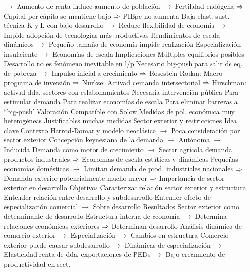 \documentclass{nuevotema}
\begin{document}
\begin{esquemal}
				\4[] $\to$ Aumento de renta induce aumento de población
				\4[] $\to$ Fertilidad endógena
				\4[] $\Rightarrow$ Capital per cápita se mantiene bajo
				\4[] $\Rightarrow$ PIBpc no aumenta
				\4 Baja elast. sust. técnica K y L con bajo desarrollo
				\4[] $\to$ Reduce flexibilidad de economía
				\4[] $\to$ Impide adopción de tecnologías más productivas
				\4 Rendimientos de escala dinámicos
				\4[] $\to$ Pequeño tamaño de economía impide realización
				\4 Especialización insuficiente
				\4[] $\to$ Economías de escala
			\3 Implicaciones
				\4 Múltiples equilibrios posibles
				\4[] Desarrollo no es fenómeno inevitable en l/p
				\4 Necesario big-push para salir de eq. de pobreza
				\4[] $\to$ Impulso inicial a crecimiento
				\4[] $\Rightarrow$ Rosestein-Rodan: Macro-programa de inversión
				\4[] $\Rightarrow$ Nurkse: Activad demanda intersectorial
				\4[] $\Rightarrow$ Hirschman: activad dda. sectores con eslabonamientos
				\4 Necesaria intervención pública
				\4[] Para estimular demanda
				\4[] Para realizar economías de escala
				\4[] Para eliminar barreras a ``big-push'
			\3 Valoración
				\4 Compatible con Solow
				\4 Medidas de pol. económica muy heterogéneas
				\4[] Justificables muchas medidas
		\2 Sector exterior y restricciones
			\3 Idea clave
				\4 Contexto
				\4[] Harrod-Domar y modelo neoclásico
				\4[] $\to$ Poca consideración por sector exterior
				\4[] Concepción keynesiana de la demanda
				\4[] $\to$ Autónoma
				\4[] $\to$ Inducida
				\4[] Demanda como motor de crecimiento
				\4[] $\to$ Sector agrícola demanda productos industriales
				\4[] $\Rightarrow$ Economías de escala estáticas y dinámicas
				\4[] Pequeñas economías domésticas
				\4[] $\to$ Limitan demanda de prod. industriales nacionales
				\4[] $\Rightarrow$ Demanda exterior potencialmente mucho mayor
				\4[] $\Rightarrow$ Importancia de sector exterior en desarrollo
				\4 Objetivos
				\4[] Caracterizar relación sector exterior y estructura
				\4[] Entender relación entre desarrollo y subdesarrollo
				\4[] Entender efecto de especialización comercial
				\4[] $\to$ Sobre desarrollo
				\4 Resultados
				\4[] Sector exterior como determinante de desarrollo
				\4[] Estructura interna de economía
				\4[] $\to$ Determina relaciones económicas exteriores
				\4[] $\Rightarrow$ Determinan desarrollo
				\4[] Análisis dinámico de comercio exterior
				\4[] $\to$ Especialización
				\4[] $\to$ Cambios en estructura
				\4[] Comercio exterior puede causar subdesarrollo
				\4[] $\to$ Dinámicas de especialización
				\4[] $\to$ Elasticidad-renta de dda. exportaciones de PEDs
				\4[] $\to$ Bajo crecimiento de productividad en sect.

\end{esquemal}
\end{document}
